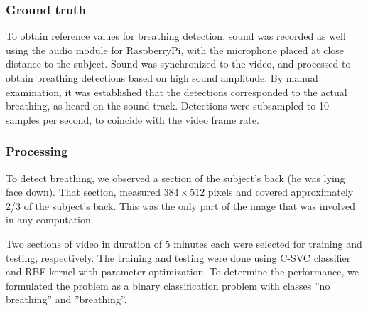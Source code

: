 \subsubsection{Ground truth}
To obtain reference values for breathing detection, sound was recorded as well using the audio module for RaspberryPi, with the microphone placed at close distance to the subject. Sound was synchronized to the video, and processed to obtain breathing detections based on high sound amplitude. By manual examination, it was established that the detections corresponded to the actual breathing, as heard on the sound track. Detections were subsampled to 10 samples per second, to coincide with the video frame rate.

\subsubsection{Processing}\label{sec:data-preprocessing}
To detect breathing, we observed a section of the subject's back (he was lying face down). That section, measured $384 \times 512$ pixels and covered approximately 2/3 of the subject's back. This was the only part of the image that was involved in any computation. 

Two sections of video in duration of 5 minutes each were selected for training and testing, respectively. The training and testing were done using C-SVC classifier and RBF kernel with parameter optimization. To determine the performance, we formulated the problem as a binary classification problem with classes ''no breathing'' and ''breathing''.

